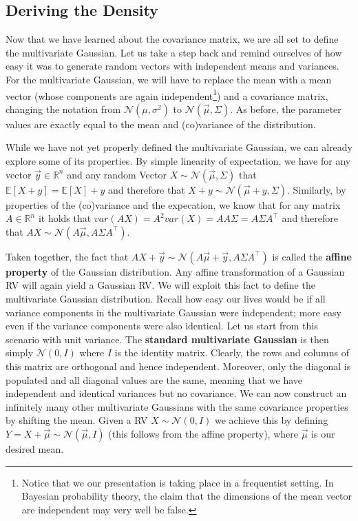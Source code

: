 \documentclass[a4paper,11pt,leqno]{report}\usepackage[]{graphicx}\usepackage[]{color}
\newcommand{\E}{\mathbb{E}}
\newcommand{\N}[2]{\mathcal{N}\left( #1, #2 \right)}
\begin{document}
\subsection{Deriving the Density}

Now that we have learned about the covariance matrix, we are all set to define the multivariate Gaussian. Let us take a step back and remind ourselves of how easy
it was to generate random vectors with independent means and variances. For the multivariate Gaussian, we will have to replace the mean with a mean vector (whose
components are again independent\footnote{Notice that we our presentation is taking place in a frequentist setting. In Bayesian probability theory, the claim that
the dimensions of the mean vector are independent may very well be false.}) and a covariance matrix, changing the notation from $ \N{\mu}{\sigma^{2}} $
to $ \N{\vec{\mu}}{\Sigma} $. As before, the parameter values are exactly equal to the mean and (co)variance of the distribution.

While we have not yet properly defined the multivariate Gaussian, we can already explore some of its properties. By simple linearity of expectation, we have
for any vector $ \vec{y} \in \mathbb{R}^{n} $ and any random Vector $ X \sim \N{\vec{\mu}}{\Sigma} $ that $ \E[X + y] = \E[X] + y $ and therefore that
$ X + y \sim \N{\vec{\mu} + y}{\Sigma} $. Similarly, by properties of the (co)variance and the expecation, 
we know that for any matrix $ A \in \mathbb{R}^{n} $ it holds that
$ var(AX) = A^{2}var(X) = AA\Sigma = A\Sigma A^{\top} $ and therefore that $ AX \sim \N{A\vec{\mu}}{A\Sigma A^{\top}} $. 

Taken together, the fact that $ AX + \vec{y} \sim \N{A\vec{\mu} + \vec{y}}{A\Sigma A^{\top}} $ is called the \textbf{affine property} of the Gaussian distribution.
Any affine transformation of a Gaussian RV will again yield a Gaussian RV. We will exploit this fact to define the multivariate Gaussian distribution. Recall
how easy our lives would be if all variance components in the multivariate Gaussian were independent; more easy even if the variance components were also identical.
Let us start from this scenario with unit variance. The \textbf{standard multivariate Gaussian} is then simply $ \N{0}{I} $ where $ I $ is the identity matrix. Clearly,
the rows and columns of this matrix are orthogonal and hence independent. Moreover, only the diagonal is populated and all diagonal values are the same, meaning
that we have independent and identical variances but no covariance. We can now construct an infinitely many other multivariate Gaussians with the same covariance
properties by shifting the mean. Given a RV $ X \sim \N{0}{I} $ we achieve this by defining $ Y = X + \vec{\mu} \sim \N{\vec{\mu}}{I} $ (this follows from the affine 
property), where $ \vec{\mu} $ is our desired mean.
\end{document}
